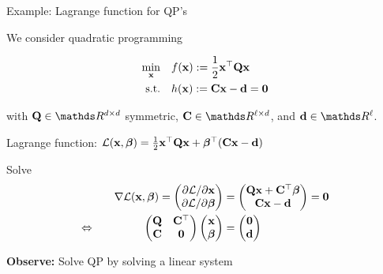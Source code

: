\documentclass[11pt,compress,t,notes=noshow, xcolor=table]{beamer}
\begin{document}
\begin{vbframe}{Example: Lagrange function for QP's}

We consider quadratic programming

\vspace{-\baselineskip}

\begin{align*}
    \min_{\mathbf{x}} \quad& f(\mathbf{x}) := \frac{1}{2} \mathbf{x}^\top \mathbf{Q} \mathbf{x} \\
    \text{s.t.} \quad& h(\mathbf{x}) := \mathbf{C} \mathbf{x} - \mathbf{d} = \mathbf{0}
\end{align*}

with $\mathbf{Q} \in \R^{d\times d}$ symmetric, $\mathbf{C} \in \R^{\ell \times d}$, and $\mathbf{d} \in \R^\ell$.

\medskip

Lagrange function: $\mathcal{L}(\mathbf{x}, \bm{\beta}) = \frac{1}{2} \mathbf{x}^\top \mathbf{Q} \mathbf{x} + \bm{\beta}^\top (\mathbf{C} \mathbf{x} - \mathbf{d})$

\medskip

Solve
\begin{alignat*}{3}
    && \nabla \mathcal{L}(\mathbf{x}, \bm{\beta}) =
    \begin{pmatrix}
        \partial \mathcal{L} / \partial \mathbf{x} \\
        \partial \mathcal{L} / \partial {\bm{\beta}}
    \end{pmatrix} &=
    \begin{pmatrix}
        \mathbf{Q} \mathbf{x} + \mathbf{C}^\top\bm{\beta} \\
        \mathbf{C} \mathbf{x} - \mathbf{d}
    \end{pmatrix} = \bm{0} \\
    \Leftrightarrow \quad && \begin{pmatrix}
        \mathbf{Q} & \mathbf{C}^\top \\
        \mathbf{C} & \bm{0}
    \end{pmatrix}
    \begin{pmatrix} \mathbf{x} \\ \bm{\beta} \end{pmatrix} &=
    \begin{pmatrix} \bm{0} \\ \mathbf{d} \end{pmatrix}
\end{alignat*}

\textbf{Observe:} Solve QP by solving a linear system

\end{vbframe}
\end{document}
